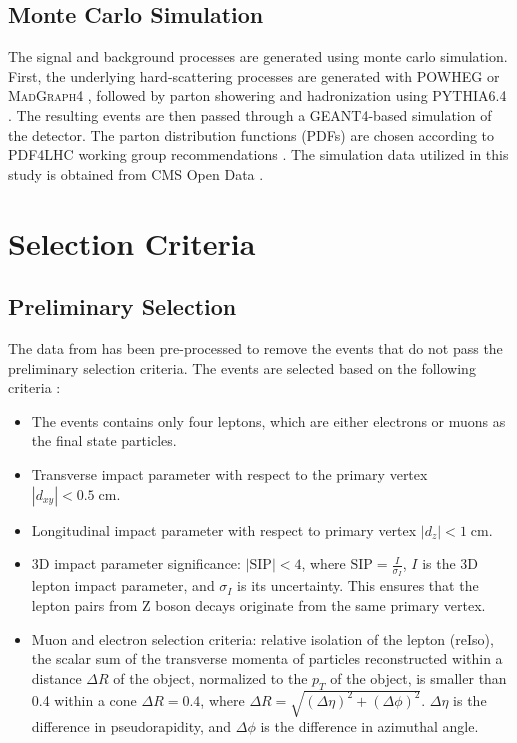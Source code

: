 \subsection{Monte Carlo Simulation}
The signal and background processes are generated using monte carlo simulation. First, the underlying hard-scattering processes are generated with \textsc{POWHEG} \cite{Alioli:2010xd} or \textsc{MadGraph}4 \cite{Alwall:2007st}, followed by parton showering and hadronization using \textsc{PYTHIA}6.4 \cite{Sjostrand:2006za}. The resulting events are then passed through a \textsc{GEANT4}-based \cite{Agostinelli:2002hh} simulation of the detector. The parton distribution functions (PDFs) are chosen according to \textsc{PDF4LHC} working group recommendations \cite{Botje:2011sn,Alekhin:2011sk,Lai:2010vv,Ball:2011mu}. The simulation data utilized in this study is obtained from CMS Open Data \cite{CMS_2010_data,MIT:Higgs4L2020,Hu2020HiggsTo4L}.

\section{Selection Criteria}

\subsection{Preliminary Selection}
The data from \cite{MIT:Higgs4L2020,Hu2020HiggsTo4L} has been pre-processed to remove the events that do not pass the preliminary selection criteria. The events are selected based on the following criteria \cite{Hu2020HiggsTo4L}:

\begin{itemize}
  \item The events contains only four leptons, which are either electrons or muons as the final state particles.
  \item Transverse impact parameter with respect to the primary vertex $|d_{xy}| < 0.5\;\text{cm}$.
  \item Longitudinal impact parameter with respect to primary vertex $|d_{z}| < 1\;\text{cm}$.
  \item 3D impact parameter significance: $|\text{SIP}| < 4$, where $\text{SIP} = \frac{I}{\sigma_I}$, $I$ is the 3D lepton impact parameter, and $\sigma_I$ is its uncertainty. This ensures that the lepton pairs from Z boson decays originate from the same primary vertex.
  \item Muon and electron selection criteria: relative isolation of the lepton (reIso), the scalar sum of the transverse momenta of particles reconstructed within a distance $\Delta R$ of the object, normalized to the $p_T$ of the object, is smaller than 0.4 within a cone $\Delta R = 0.4$, where $\Delta R = \sqrt{(\Delta\eta)^2 + (\Delta\phi)^2}$. $\Delta \eta$ is the difference in pseudorapidity, and $\Delta \phi$ is the difference in azimuthal angle. 
\end{itemize}

